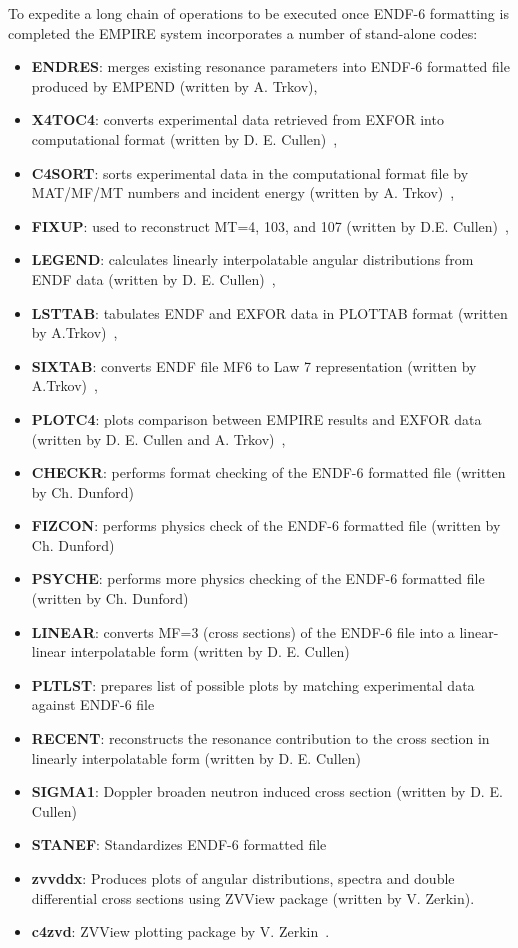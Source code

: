 \documentclass[twocolumn,amsmath,amssymb,10pt,groupedaddress,a4paper]{revtex4}
\begin{document}
To expedite a long chain of operations to be executed once ENDF-6 formatting is completed
the EMPIRE system incorporates a number of stand-alone codes:
\begin{itemize}
\item \textbf{ENDRES}: merges existing resonance parameters
into ENDF-6 formatted file produced by EMPEND (written by A. Trkov),
\item \textbf{X4TOC4}: converts experimental data retrieved
from EXFOR into computational format (written by D. E. Cullen)~\cite{PREPRO},
\item \textbf{C4SORT}: sorts experimental data in the computational
format file by MAT/MF/MT numbers and incident energy (written by A. Trkov)~\cite{ENDVER},
\item \textbf{FIXUP}: used to reconstruct MT=4, 103, and
107 (written by D.E. Cullen)~\cite{PREPRO},
\item \textbf{LEGEND}: calculates linearly interpolatable
angular distributions from ENDF data (written by D. E. Cullen)~\cite{PREPRO},
\item \textbf{LSTTAB}: tabulates ENDF and EXFOR data in
PLOTTAB format (written by A.Trkov)~\cite{ENDVER},
\item \textbf{SIXTAB}: converts ENDF file MF6 to Law 7 representation
(written by A.Trkov)~\cite{ENDVER},
\item \textbf{PLOTC4}: plots comparison between EMPIRE results
and EXFOR data (written by D. E. Cullen and A. Trkov)~\cite{ENDVER},
\item \textbf{CHECKR}: performs format checking of the ENDF-6
formatted file (written by Ch. Dunford)
\item \textbf{FIZCON}: performs physics check of the ENDF-6 formatted file
(written by Ch. Dunford)
\item \textbf{PSYCHE}: performs more physics checking of the ENDF-6 formatted
file (written by Ch. Dunford)
\item \textbf{LINEAR}: converts MF=3 (cross sections) of the ENDF-6 file
into a linear-linear interpolatable form (written by D. E. Cullen)~\cite{PREPRO}
\item \textbf{PLTLST}: prepares list of possible plots by matching experimental
data against ENDF-6 file
\item \textbf{RECENT}: reconstructs the resonance contribution to the cross
section in linearly interpolatable form (written by D. E. Cullen)~\cite{PREPRO}
\item \textbf{SIGMA1}: Doppler broaden neutron induced cross section (written
by D. E. Cullen)~\cite{PREPRO}
\item \textbf{STANEF}: Standardizes ENDF-6 formatted file
\item \textbf{zvvddx}: Produces plots of angular distributions, spectra
and double differential cross sections using ZVView package (written
by V. Zerkin).
\item \textbf{c4zvd}: ZVView\textbf{} plotting package by
V. Zerkin~\cite{ZVView}.
\end{itemize}
\end{document}
